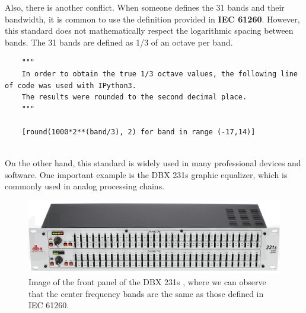 Also, there is another conflict. When someone defines the 31 bands and their bandwidth, it is common to use the definition provided in \textbf{IEC 61260}. However, this standard does not mathematically respect the logarithmic spacing between bands. The 31 bands are defined as 1/3 of an octave per band.

\begin{table}[H]
\centering
\caption{Center frequencies for true 1/3 octave bands and IEC 61260 bands} 

\end{table}

\begin{verbatim}
	"""
	In order to obtain the true 1/3 octave values, the following line of code was used with IPython3.
	The results were rounded to the second decimal place.
	"""
	
	[round(1000*2**(band/3), 2) for band in range (-17,14)]
	
\end{verbatim}

On the other hand, this standard is widely used in many professional devices and software. One important example is the DBX 231s graphic equalizer, which is commonly used in analog processing chains.

\begin{figure}[H]
	\centering
	\includegraphics[width=1
	\linewidth]{Figures/DBX_231s.png}
	\caption{Image of the front panel of the DBX 231s \cite{DBX_31s}, where we can observe that the center frequency bands are the same as those defined in IEC 61260.}
	\label{fig:DBX_31s}
\end{figure}

